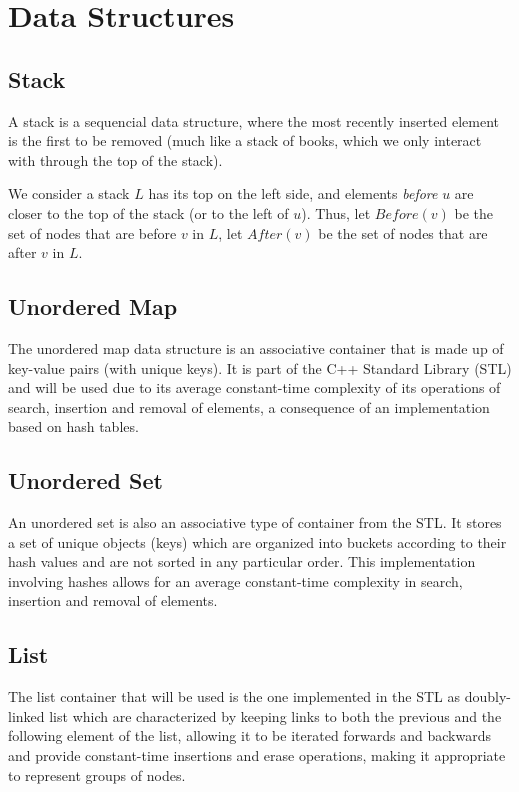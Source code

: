 \chapter{Data Structures} \label{data-structures}

\section{Stack}
A stack is a sequencial data structure, where the most recently inserted element is the first to be removed (much like a stack of books, which we only interact with through the top of the stack).\par
We consider a stack $L$ has its top on the left side, and elements \emph{before} $u$ are closer to the top of the stack (or to the left of $u$). Thus, let $Before(v)$ be the set of nodes that are before $v$ in $L$, let $After(v)$ be the set of nodes that are after $v$ in $L$.

\section{Unordered Map}
The unordered map data structure is an associative container that is made up of key-value pairs (with unique keys). It is part of the C++ Standard Library (STL) and will be used due to its average constant-time complexity of its operations of search, insertion and removal of elements, a consequence of an implementation based on hash tables.

\section{Unordered Set}
An unordered set is also an associative type of container from the STL. It stores a set of unique objects (keys) which are organized into buckets according to their hash values and are not sorted in any particular order. This implementation involving hashes allows for an average constant-time complexity in search, insertion and removal of elements.

\section{List}
The list container that will be used is the one implemented in the STL as doubly-linked list which are characterized by keeping links to both the previous and the following element of the list, allowing it to be iterated forwards and backwards and provide constant-time insertions and erase operations, making it appropriate to represent groups of nodes.

